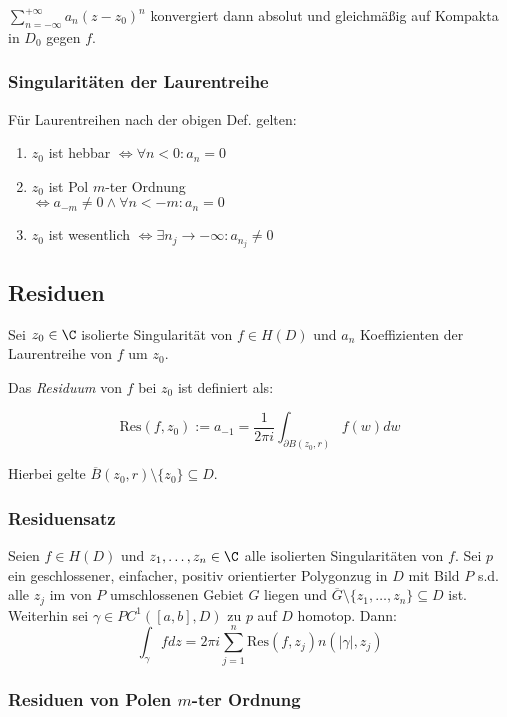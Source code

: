 \(\sum_{n=-\infty}^{+\infty} a_n(z-z_0)^n\) konvergiert dann absolut und gleichmäßig auf Kompakta in \(D_0\) gegen \(f\).

\subsubsection*{Singularitäten der Laurentreihe}

Für Laurentreihen nach der obigen Def. gelten:

\begin{enumerate}[label=(\alph*)]
	\item \(z_0\) ist hebbar \(\iff \forall n < 0 : a_n = 0\)
	\item \(z_0\) ist Pol \(m\)-ter Ordnung \\ \(\iff a_{-m} \neq 0 \land \forall n < -m : a_n = 0\)
	\item \(z_0\) ist wesentlich \(\iff \exists n_j \to -\infty : a_{n_j} \neq 0\)
\end{enumerate}

\subsection*{Residuen}

Sei \(z_0 \in \C\) isolierte Singularität von \(f \in H(D)\) und \(a_n\) Koeffizienten der Laurentreihe von \(f\) um \(z_0\).

Das \emph{Residuum} von \(f\) bei \(z_0\) ist definiert als:

\[ \text{Res}(f,z_0) := a_{-1} = \frac{1}{2\pi i} \int_{\partial B(z_0,r)} f(w) dw \]

Hierbei gelte \(\overline B(z_0,r) \setminus \{z_0\} \subseteq D\).

\subsubsection*{Residuensatz}

Seien \(f \in H(D)\) und \(z_1, \dots, z_n \in \C\) alle isolierten Singularitäten von \(f\). Sei \(p\) ein geschlossener, einfacher, positiv orientierter Polygonzug in \(D\) mit Bild \(P\) s.d. alle \(z_j\) im von \(P\) umschlossenen Gebiet \(G\) liegen und \(\overline G \setminus \{z_1,\dots,z_n\} \subseteq D\) ist. Weiterhin sei \(\gamma \in PC^1([a,b],D)\) zu \(p\) auf \(D\) homotop. Dann: \[ \int_\gamma f dz = 2\pi i \sum_{j=1}^n \text{Res}(f,z_j) n(|\gamma|,z_j) \]

\subsubsection*{Residuen von Polen \(m\)-ter Ordnung}

